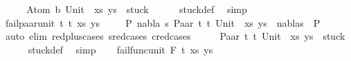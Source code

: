 \begin{isabellebody}
\ \ \isamarkupfalse%
\ \isamarkupfalse%
\ {\isachardoublequoteopen}{\isacharparenleft}{\kern0pt}{\isacharparenleft}{\kern0pt}Atom\ b{\isacharcomma}{\kern0pt}\ Unit{\isacharparenright}{\kern0pt}\ {\isacharhash}{\kern0pt}\ xs{\isacharcomma}{\kern0pt}\ ys{\isacharparenright}{\kern0pt}\ {\isasymin}\ stuck{\isachardoublequoteclose}\isanewline
\ \ \ \ \isamarkupfalse%
\ stuck{\isacharunderscore}{\kern0pt}def\ \isamarkupfalse%
\ simp\isanewline
{}\isamarkupfalse%
\isanewline
\ \ \isamarkupfalse%
\ {\isacharparenleft}{\kern0pt}fail{\isacharunderscore}{\kern0pt}paar{\isacharunderscore}{\kern0pt}unit\ t{}\ t{}\ xs\ ys{\isacharparenright}{\kern0pt}\isanewline
\ \ \isamarkupfalse%
\ {\isachardoublequoteopen}{\isasymnot}\ {\isacharparenleft}{\kern0pt}{\isasymexists}P{}\ nabla\ s{\isachardot}{\kern0pt}\ {\isacharparenleft}{\kern0pt}{\isacharparenleft}{\kern0pt}Paar\ t{}\ t{}{\isacharcomma}{\kern0pt}\ Unit{\isacharparenright}{\kern0pt}\ {\isacharhash}{\kern0pt}\ xs{\isacharcomma}{\kern0pt}\ ys{\isacharparenright}{\kern0pt}\ {\isasymTurnstile}\ {\isacharparenleft}{\kern0pt}nabla{\isacharcomma}{\kern0pt}s{\isacharparenright}{\kern0pt}\ {\isasymRightarrow}\ P{}{\isacharparenright}{\kern0pt}{\isachardoublequoteclose}\isanewline
\ \ \ \ \isamarkupfalse%
\ {\isacharparenleft}{\kern0pt}auto\ elim{\isacharcolon}{\kern0pt}\ red{\isacharunderscore}{\kern0pt}plus{\isachardot}{\kern0pt}cases\ s{\isacharunderscore}{\kern0pt}red{\isachardot}{\kern0pt}cases\ c{\isacharunderscore}{\kern0pt}red{\isachardot}{\kern0pt}cases{\isacharparenright}{\kern0pt}\isanewline
\ \ \isamarkupfalse%
\ \isamarkupfalse%
\ {\isachardoublequoteopen}{\isacharparenleft}{\kern0pt}{\isacharparenleft}{\kern0pt}Paar\ t{}\ t{}{\isacharcomma}{\kern0pt}\ Unit{\isacharparenright}{\kern0pt}\ {\isacharhash}{\kern0pt}\ xs{\isacharcomma}{\kern0pt}\ ys{\isacharparenright}{\kern0pt}\ {\isasymin}\ stuck{\isachardoublequoteclose}\isanewline
\ \ \ \ \isamarkupfalse%
\ stuck{\isacharunderscore}{\kern0pt}def\ \isamarkupfalse%
\ simp\isanewline
{}\isamarkupfalse%
\isanewline
\ \ \isamarkupfalse%
\ {\isacharparenleft}{\kern0pt}fail{\isacharunderscore}{\kern0pt}func{\isacharunderscore}{\kern0pt}unit\ F\ t{}\ xs\ ys{\isacharparenright}{\kern0pt}\isanewline

\end{isabellebody}
